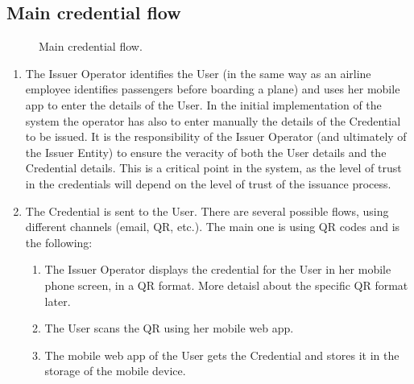 \documentclass[letterpaper,10pt,english]{sphinxmanual}
\begin{document}
\subsection{Main credential flow}
\label{\detokenize{privacycred:main-credential-flow}}
\begin{figure}[htbp]
\centering
\capstart

\noindent{}
\caption{Main credential flow.}\label{\detokenize{privacycred:id4}}\end{figure}
\begin{enumerate}
%
\item {} 
\sphinxAtStartPar
{}

\sphinxAtStartPar
The Issuer Operator identifies the User (in the same way as an airline employee identifies passengers before boarding a plane) and uses her mobile app to enter the details of the User. In the initial implementation of the system the operator has also to enter manually the details of the Credential to be issued. It is the responsibility of the Issuer Operator (and ultimately of the Issuer Entity) to ensure the veracity of both the User details and the Credential details. This is a critical point in the system, as the level of trust in the credentials will depend on the level of trust of the issuance process.

\item {} 
\sphinxAtStartPar
{}

\sphinxAtStartPar
The Credential is sent to the User. There are several possible flows, using different channels (email, QR, etc.). The main one is using QR codes and is the following:
\begin{enumerate}
%
\item {} 
\sphinxAtStartPar
The Issuer Operator displays the credential for the User in her mobile phone screen, in a QR format. More detaisl about the specific QR format later.

\item {} 
\sphinxAtStartPar
The User scans the QR using her mobile web app.

\item {} 
\sphinxAtStartPar
The mobile web app of the User gets the Credential and stores it in the storage of the mobile device.


\end{enumerate}
\end{enumerate}
\end{document}
